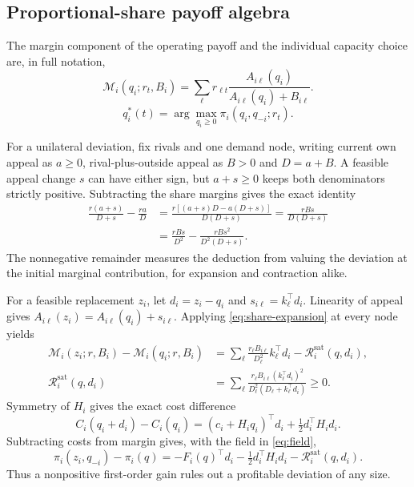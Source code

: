 \subsection{Proportional-share payoff algebra}\label{app:payoff}

The margin component of the operating payoff and the individual capacity
choice are, in full notation,
\begin{equation}\label{eq:revenue}
  \mathcal M_i(q_i;r_t,B_i)=\sum_\ell r_{\ell t}
  \frac{A_{i\ell}(q_i)}{A_{i\ell}(q_i)+B_{i\ell}}.
\end{equation}
\begin{equation}\label{eq:firm-choice}
  q_i^*(t)=\arg\max_{q_i\geq0}\pi_i(q_i,q_{-i};r_t).
\end{equation}

For a unilateral deviation, fix rivals and one demand node, writing current
own appeal as $a\geq0$, rival-plus-outside appeal as $B>0$ and $D=a+B$.
A feasible appeal change $s$ can have either sign, but $a+s\geq0$ keeps both
denominators strictly positive.
Subtracting the share margins gives the exact identity
\begin{align}
  \frac{r(a+s)}{D+s}-\frac{ra}{D}
  &=\frac{r[(a+s)D-a(D+s)]}{D(D+s)}
  =\frac{rBs}{D(D+s)}\label{eq:app-share}\\
  &=\frac{rBs}{D^2}-\frac{rBs^2}{D^2(D+s)}.\label{eq:share-expansion}
\end{align}
The nonnegative remainder measures the deduction from valuing the deviation
at the initial marginal contribution, for expansion and contraction alike.

For a feasible replacement $z_i$, let $d_i=z_i-q_i$ and
$s_{i\ell}=k_\ell^\top d_i$.
Linearity of appeal gives $A_{i\ell}(z_i)=A_{i\ell}(q_i)+s_{i\ell}$.
Applying \eqref{eq:share-expansion} at every node yields
\begin{align}
  \mathcal M_i(z_i;r,B_i)-\mathcal M_i(q_i;r,B_i)
  &=\sum_\ell\frac{r_\ell B_{i\ell}}{D_\ell^2}k_\ell^\top d_i
  -\mathcal R_i^{\mathrm{sat}}(q,d_i),\label{eq:app-revenue-expansion}\\
  \mathcal R_i^{\mathrm{sat}}(q,d_i)
  &=\sum_\ell\frac{r_\ell B_{i\ell}(k_\ell^\top d_i)^2}
  {D_\ell^2(D_\ell+k_\ell^\top d_i)}\geq0.\label{eq:app-remainder}
\end{align}
Symmetry of $H_i$ gives the exact cost difference
\begin{equation}\label{eq:app-cost-expansion}
  C_i(q_i+d_i)-C_i(q_i)
  =(c_i+H_i q_i)^\top d_i+\tfrac12d_i^\top H_i d_i.
\end{equation}
Subtracting costs from margin gives, with the field in \eqref{eq:field},
\begin{equation}\label{eq:payoff-expansion}
  \pi_i(z_i,q_{-i})-\pi_i(q)
  =-F_i(q)^\top d_i-\tfrac12d_i^\top H_i d_i-\mathcal R_i^{\mathrm{sat}}(q,d_i).
\end{equation}
Thus a nonpositive first-order gain rules out a profitable deviation of any size.

